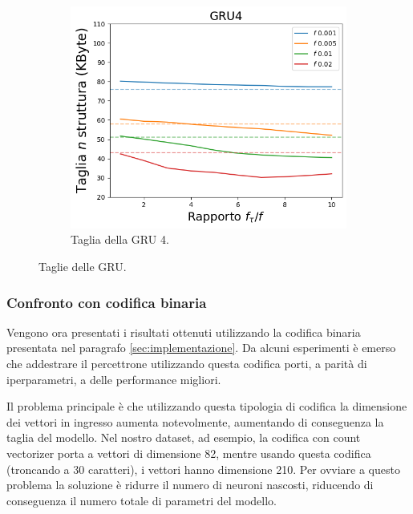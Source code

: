 \documentclass[../../main.tex]{subfiles}
\begin{document}
\begin{figure}[H]
\begin{subfigure}[b]{0.32\textwidth}
            \label{fig:SLBFTagliaGRU8}
        \end{subfigure}
        \begin{subfigure}[b]{0.32\textwidth}
            \centering
            \includegraphics[width = \textwidth]{immagini/7/SLBF/GRU4_Taglia.png}
            \caption{Taglia della GRU 4.}
            \label{fig:SLBFTagliaGRU4}
        \end{subfigure}
        \caption{Taglie delle GRU.}
        \label{fig:taglieGRUSLBF}
    \end{figure}

    \subsubsection{Confronto con codifica binaria}
    Vengono ora presentati i risultati ottenuti utilizzando la codifica binaria presentata nel paragrafo \ref{sec:implementazione}. Da alcuni esperimenti è emerso che addestrare il percettrone utilizzando questa codifica porti, a parità di iperparametri, a delle performance migliori. 
    
    Il problema principale è che utilizzando questa tipologia di codifica la dimensione dei vettori in ingresso aumenta notevolmente, aumentando di conseguenza la taglia del modello. Nel nostro dataset, ad esempio, la codifica con count vectorizer porta a vettori di dimensione 82, mentre usando questa codifica (troncando a 30 caratteri), i vettori hanno dimensione 210. Per ovviare a questo problema la soluzione è ridurre il numero di neuroni nascosti, riducendo di conseguenza il numero totale di parametri del modello.
\end{document}
